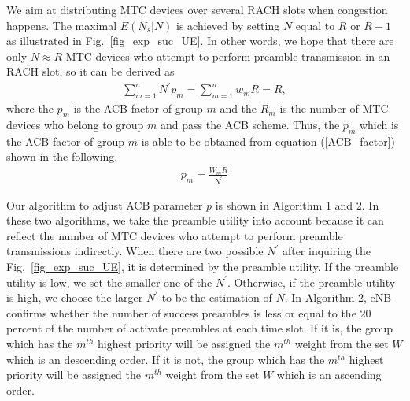     We aim at distributing MTC devices over several RACH slots when congestion happens. The maximal $E(N_s|N)$ is achieved by setting $N$ equal to $R$ or $R-1$ as illustrated in Fig.~\ref{fig_exp_suc_UE}. In other words, we hope that there are only $N\approx R$ MTC devices who attempt to perform preamble transmission in an RACH slot, so it can be derived as
    \begin{align}
    \label{ACB_factor}
      \sum_{m=1}^{n} N^\prime p_m=\sum_{m=1}^{n}w_mR=R,
    \end{align}
    where the $p_m$ is the ACB factor of group $m$ and the $R_m$ is the number of MTC devices who belong to group $m$ and pass the ACB scheme. Thus, the $p_m$ which is the ACB factor of group $m$ is able to be obtained from equation (\ref{ACB_factor}) shown in the following.
    \begin{align}
      p_m=\frac{W_m R}{N^\prime}
    \end{align}

    Our algorithm to adjust ACB parameter $p$ is shown in Algorithm 1 and 2. In these two algorithms, we take the preamble utility into account because it can reflect the number of MTC devices who attempt to perform preamble transmissions indirectly. When there are two possible $N^\prime$ after inquiring the Fig.~\ref{fig_exp_suc_UE}, it is determined by the preamble utility. If the preamble utility is low, we set the smaller one of the $N^\prime$. Otherwise, if the preamble utility is high, we choose the larger $N^\prime$ to be the estimation of $N$. 
    In Algorithm 2, eNB confirms whether the number of success preambles is less or equal to the $20$ percent of the number of activate preambles at each time slot. If it is, the group which has the $m^{th}$ highest priority will be assigned the $m^{th}$ weight from the set $W$ which is an descending order. If it is not, the group which has the $m^{th}$ highest priority will be assigned the $m^{th}$ weight from the set $W$ which is an ascending order. 